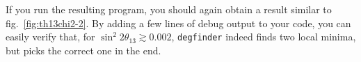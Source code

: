 \documentclass[12pt,a4paper]{article}
\newcommand{\sthchooz}{\ensuremath{\sin^2 2\theta_{13}}}
\theoremstyle{dotless}
\begin{document}
If you run the resulting program, you should again obtain a result similar to
fig.~\ref{fig:th13chi2-2}. By adding a few lines of debug output to your code,
you can easily verify that, for $\sthchooz \gtrsim 0.002$, {\tt degfinder}
indeed finds two local minima, but picks the correct one in the end.
\end{document}
